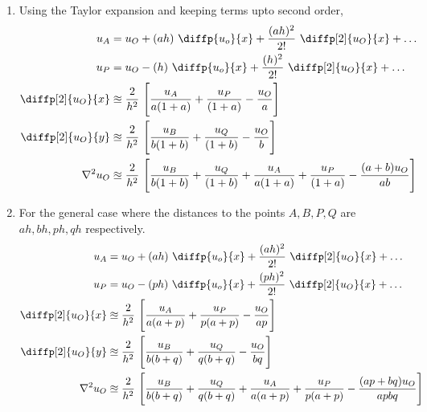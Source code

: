 \begin{enumerate}
    \item Using the Taylor expansion and keeping terms upto second order,
          \begin{align}
              u_A                & = u_O + (ah)\ \diffp{u_o}{x} + \frac{(ah)^2}{2!}
              \ \diffp[2]{u_O}{x} + \dots                                           \\
              u_P                & = u_O - (h)\ \diffp{u_o}{x} + \frac{(h)^2}{2!}
              \ \diffp[2]{u_O}{x} + \dots                                           \\
              \diffp[2] {u_O}{x} & \approxeq \frac{2}{h^2}\ \Bigg[
              \frac{u_A}{a(1+a)} + \frac{u_P}{(1+a)} - \frac{u_O}{a} \Bigg]         \\
              \diffp[2] {u_O}{y} & \approxeq \frac{2}{h^2}\ \Bigg[
              \frac{u_B}{b(1+b)} + \frac{u_Q}{(1+b)} - \frac{u_O}{b} \Bigg]         \\
              \nabla^2 u_O       & \approxeq \frac{2}{h^2}\ \Bigg[
                  \frac{u_B}{b(1+b)} + \frac{u_Q}{(1+b)} +
                  \frac{u_A}{a(1+a)} + \frac{u_P}{(1+a)}
                  - \frac{(a+b) u_O}{ab} \Bigg]
          \end{align}

    \item For the general case where the distances to the points $ A,B,P,Q $ are
          $ ah,bh,ph,qh $ respectively.
          \begin{align}
              u_A                & = u_O + (ah)\ \diffp{u_o}{x} + \frac{(ah)^2}{2!}
              \ \diffp[2]{u_O}{x} + \dots                                           \\
              u_P                & = u_O - (ph)\ \diffp{u_o}{x} + \frac{(ph)^2}{2!}
              \ \diffp[2]{u_O}{x} + \dots                                           \\
              \diffp[2] {u_O}{x}
                                 & \approxeq \frac{2}{h^2}\ \Bigg[
              \frac{u_A}{a(a+p)} + \frac{u_P}{p(a+p)} - \frac{u_O}{ap} \Bigg]       \\
              \diffp[2] {u_O}{y} & \approxeq \frac{2}{h^2}\ \Bigg[
              \frac{u_B}{b(b+q)} + \frac{u_Q}{q(b+q)} - \frac{u_O}{bq} \Bigg]       \\
              \nabla^2 u_O       & \approxeq \frac{2}{h^2}\ \Bigg[
                  \frac{u_B}{b(b+q)} + \frac{u_Q}{q(b+q)} +
                  \frac{u_A}{a(a+p)} + \frac{u_P}{p(a+p)}
                  - \frac{(ap+bq) u_O}{apbq} \Bigg]
          \end{align}


\end{enumerate}
